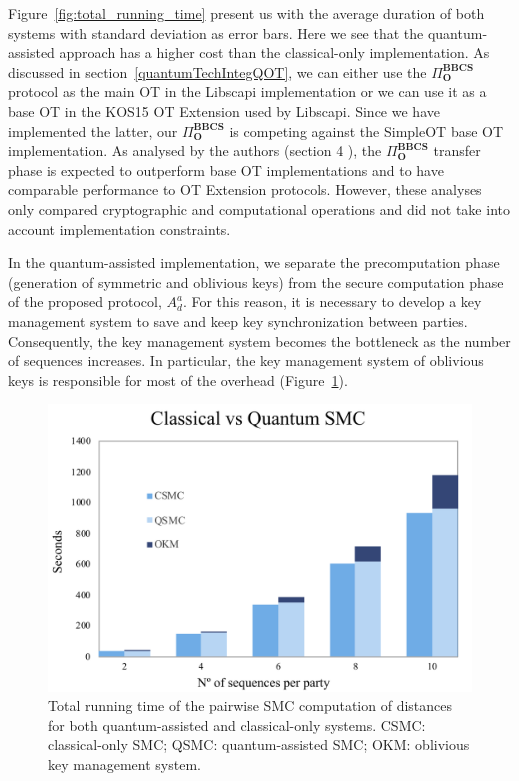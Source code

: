 Figure~\ref{fig:total_running_time} present us with the average duration of both systems with standard deviation as error bars. Here we see that the quantum-assisted approach has a higher cost than the classical-only implementation. As discussed in section~\ref{quantumTechIntegQOT}, we can either use the $\Pi^{\textbf{BBCS}}_{\textbf{O}}$ protocol as the main OT in the Libscapi implementation or we can use it as a base OT in the KOS15 OT Extension used by Libscapi. Since we have implemented the latter, our $\Pi^{\textbf{BBCS}}_{\textbf{O}}$ is competing against the SimpleOT \cite{C15} base OT implementation. As analysed by the authors (section 4 \cite{Santos2021}), the $\Pi^{\textbf{BBCS}}_{\textbf{O}}$ transfer phase is expected to outperform base OT implementations and to have comparable performance to OT Extension protocols. However, these analyses only compared cryptographic and computational operations and did not take into account implementation constraints.

In the quantum-assisted implementation, we separate the precomputation phase (generation of symmetric and oblivious keys) from the secure computation phase of the proposed protocol, $A^a_d$. For this reason, it is necessary to develop a key management system to save and keep key synchronization between parties. Consequently, the key management system becomes the bottleneck as the number of sequences increases. In particular, the key management system of oblivious keys is responsible for most of the overhead (Figure~\ref{fig:okms}).

\begin{figure}
    \centering
    \includegraphics[scale=0.8]{Chapter_PrivatePhylogeneticTrees/c-qSMC.png}
    \caption{Total running time of the pairwise SMC computation of distances for both quantum-assisted and classical-only systems. CSMC: classical-only SMC; QSMC: quantum-assisted SMC; OKM: oblivious key management system.}
    \label{fig:okms}
\end{figure}

